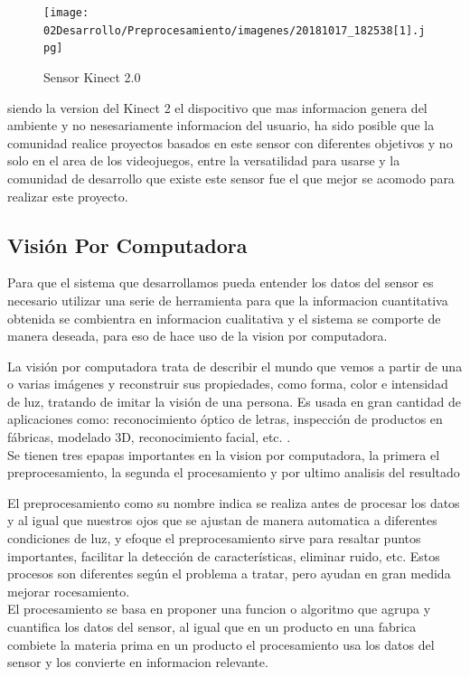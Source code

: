 \begin{figure}[!htb]
	\centering
	\texttt{[image: 02Desarrollo/Preprocesamiento/imagenes/20181017\_182538[1].jpg]}
	\caption{Sensor Kinect 2.0} 
	\label{fig:kinect}
\end{figure}

siendo la version del Kinect 2 el dispocitivo que mas informacion genera del ambiente y no nesesariamente informacion del usuario, ha sido posible que la comunidad realice proyectos basados en este sensor con diferentes objetivos y no solo en el area de los videojuegos, entre la versatilidad para usarse y la comunidad de desarrollo que existe este sensor fue el que mejor se acomodo para realizar este proyecto.

\subsection{Visión Por Computadora}

Para que el sistema que desarrollamos pueda entender los datos del sensor es necesario utilizar una serie de herramienta para que la informacion cuantitativa obtenida se combientra en informacion cualitativa y el sistema se comporte de manera deseada, para eso de hace uso de la vision por computadora.

La visión por computadora trata de describir el mundo que vemos a partir de una o varias imágenes y reconstruir sus propiedades, como forma, color e intensidad de luz, tratando de imitar la visión de una persona. Es usada en gran cantidad de aplicaciones como: reconocimiento óptico de letras, inspección de productos en fábricas, modelado 3D, reconocimiento facial, etc. \cite{CompVisionSpringer}.\\

Se tienen tres epapas importantes en la vision por computadora, la primera el preprocesamiento, la segunda el procesamiento y por ultimo analisis del resultado


El preprocesamiento como su nombre indica se realiza antes de procesar los datos y al igual que nuestros ojos que se ajustan de manera automatica a diferentes condiciones de luz, y efoque el preprocesamiento sirve para resaltar puntos importantes, facilitar la detección de características, eliminar ruido, etc. Estos procesos son diferentes según el problema a tratar, pero ayudan en gran medida mejorar rocesamiento.\\

El procesamiento se basa en proponer una funcion o algoritmo que agrupa y cuantifica los datos del sensor, al igual que en un producto en una fabrica combiete la materia prima en un producto el procesamiento usa los datos del sensor y los convierte en informacion relevante.\\

